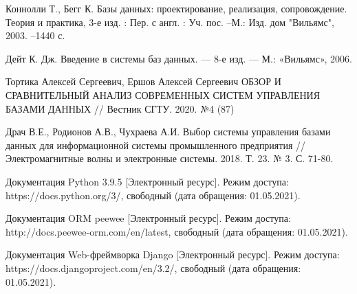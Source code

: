 \documentclass[10pt,a4paper]{report}
\begin{document}
	\makeatletter %
	\def\@biblabel#1{#1. }
	\makeatother
	\begin{thebibliography}{7}
		 Коннолли Т., Бегг К. Базы данных: проектирование, реализация, сопровождение. Теория и практика, 3-е изд. : Пер. с англ. : Уч. пос. –М.: Изд. дом "Вильямс", 2003. –1440 с.
		
		 Дейт К. Дж. Введение в системы баз данных. — 8-е изд. — М.:
		«Вильямс», 2006.
				
		 Тортика Алексей Сергеевич, Ершов Алексей Сергеевич ОБЗОР И СРАВНИТЕЛЬНЫЙ АНАЛИЗ СОВРЕМЕННЫХ СИСТЕМ УПРАВЛЕНИЯ БАЗАМИ ДАННЫХ // Вестник СГТУ. 2020. №4 (87)
		
		 Драч В.Е., Родионов А.В., Чухраева А.И. Выбор системы управления базами данных для информационной системы промышленного предприятия // Электромагнитные волны и электронные системы. 2018. Т. 23. № 3. С. 71-80.
		
		 Документация Python 3.9.5 [Электронный ресурс]. Режим доступа: https://docs.python.org/3/, свободный (дата обращения: 01.05.2021).
		
		 Документация ORM peewee [Электронный ресурс]. Режим доступа:
		 http://docs.peewee-orm.com/en/latest, свободный (дата обращения: 01.05.2021).
		 
 		 Документация Web-фреймворка Django [Электронный ресурс]. Режим доступа: https://docs.djangoproject.com/en/3.2/, свободный (дата обращения: 01.05.2021).
	\end{thebibliography}
\end{document}
